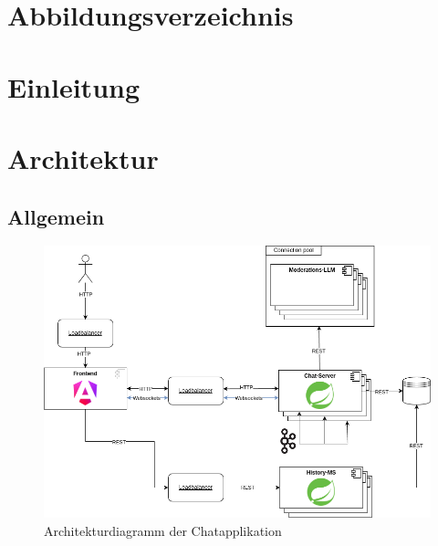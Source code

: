 \documentclass[12pt]{report}
\begin{document}
\renewcommand{\footrulewidth}{0.4pt} %


\renewcommand{\sectionmark}[1]{\markboth{#1}{}} 

\newpage


\tableofcontents
{}
\thispagestyle{plain}

\newpage
\chapter*{Abbildungsverzeichnis}

\listoffigures


\addtocounter{frontmatterPage}{\value{page}} 

\newpage
{}
\chapter{Einleitung}

\chapter{Architektur}

\section{Allgemein}
\begin{figure}[htbp]
	\centering
	\includegraphics[width=\linewidth]{architektur}
	\caption{Architekturdiagramm der Chatapplikation}
	\label{fig:Architektur}
\end{figure}
\end{document}
